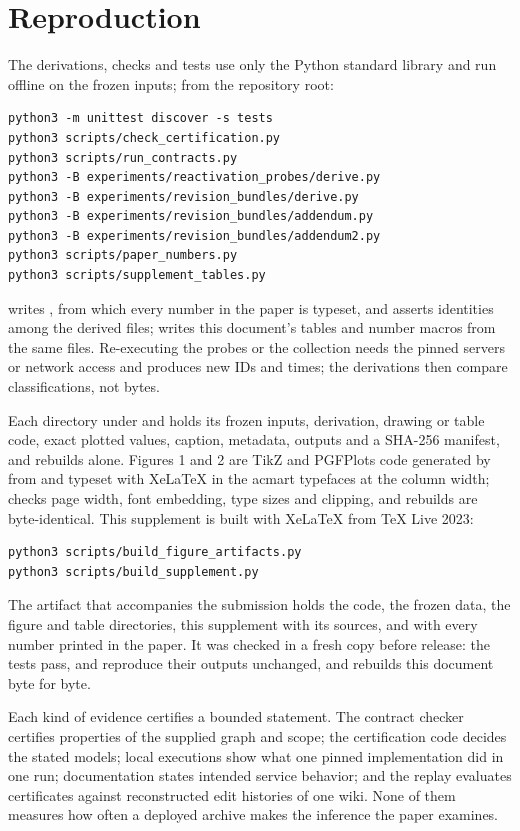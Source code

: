 \section{Reproduction}\label{sec:reproduction}
The derivations, checks and tests use only the Python standard library and
run offline on the frozen inputs; from the repository root:
\begin{footnotesize}
\begin{verbatim}
python3 -m unittest discover -s tests
python3 scripts/check_certification.py
python3 scripts/run_contracts.py
python3 -B experiments/reactivation_probes/derive.py
python3 -B experiments/revision_bundles/derive.py
python3 -B experiments/revision_bundles/addendum.py
python3 -B experiments/revision_bundles/addendum2.py
python3 scripts/paper_numbers.py
python3 scripts/supplement_tables.py
\end{verbatim}
\end{footnotesize}
 writes , from which every number
in the paper is typeset, and asserts identities among the derived files;
 writes this document's
tables and number macros from the same files. Re-executing the probes or the
collection needs the pinned servers or network access and produces new IDs
and times; the derivations then compare classifications, not bytes.

Each directory under  and 
holds its frozen inputs, derivation, drawing or table code, exact plotted
values, caption, metadata, outputs and a SHA-256 manifest, and rebuilds alone.
Figures 1 and 2 are TikZ and PGFPlots code generated by  from
 and typeset with XeLaTeX in the acmart typefaces at the
column width;  checks page width, font embedding, type sizes and
clipping, and rebuilds are byte-identical. This supplement is built with
XeLaTeX from TeX Live 2023:
\begin{footnotesize}
\begin{verbatim}
python3 scripts/build_figure_artifacts.py
python3 scripts/build_supplement.py
\end{verbatim}
\end{footnotesize}

The artifact that accompanies the submission holds the code, the frozen data,
the figure and table directories, this supplement with its sources, and
 with every number printed in the paper. It was
checked in a fresh copy before release: the tests pass,
 and  reproduce their
outputs unchanged, and  rebuilds this document byte
for byte.

Each kind of evidence certifies a bounded statement. The contract checker
certifies properties of the supplied graph and scope; the certification code
decides the stated models; local executions show what one pinned
implementation did in one run; documentation states intended service
behavior; and the replay evaluates certificates against reconstructed edit
histories of one wiki. None of them measures how often a deployed archive
makes the inference the paper examines.
